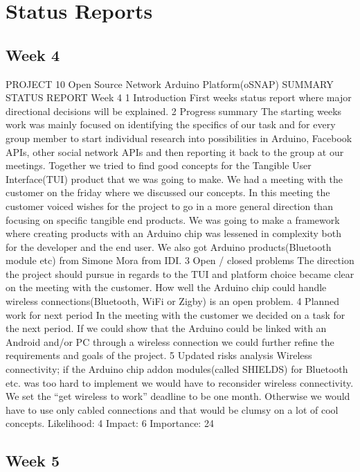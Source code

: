 \section{Status Reports}

\subsection{Week 4}

PROJECT 10 Open Source Network Arduino Platform(oSNAP)
SUMMARY STATUS REPORT
Week 4
1 Introduction
First weeks status report where major directional decisions will be explained.
2 Progress summary
The starting weeks work was mainly focused on identifying the specifics of our task and for
every group member to start individual research into possibilities in Arduino, Facebook APIs,
other social network APIs and then reporting it back to the group at our meetings. Together we
tried to find good concepts for the Tangible User Interface(TUI) product that we was going to
make. We had a meeting with the customer on the friday where we discussed our concepts. In
this meeting the customer voiced wishes for the project to go in a more general direction than
focusing on specific tangible end products. We was going to make a framework where creating
products with an Arduino chip was lessened in complexity both for the developer and the end
user.
We also got Arduino products(Bluetooth module etc) from Simone Mora from IDI.
3 Open / closed problems
The direction the project should pursue in regards to the TUI and platform choice became clear
on the meeting with the customer.
How well the Arduino chip could handle wireless connections(Bluetooth, WiFi or Zigby) is an
open problem.
4 Planned work for next period
In the meeting with the customer we decided on a task for the next period. If we could show that
the Arduino could be linked with an Android and/or PC through a wireless connection we could
further refine the requirements and goals of the project.
5 Updated risks analysis
Wireless connectivity; if the Arduino chip addon modules(called SHIELDS) for Bluetooth etc.
was too hard to implement we would have to reconsider wireless connectivity. We set the “get
wireless to work” deadline to be one month. Otherwise we would have to use only cabled
connections and that would be clumsy on a lot of cool concepts.
Likelihood: 4 Impact: 6 Importance: 24

\subsection{Week 5}

